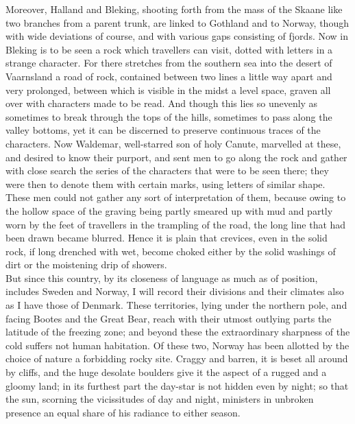 \documentclass[10pt,a4paper]{report}
\begin{document}
Moreover, Halland and Bleking, shooting forth from the mass of the Skaane like two branches from a parent trunk, are linked to Gothland and to Norway, though with wide deviations of course, and with various gaps consisting of fjords. Now in Bleking is to be seen a rock which travellers can visit, dotted with letters in a strange character. For there stretches from the southern sea into the desert of Vaarnsland a road of rock, contained between two lines a little way apart and very prolonged, between which is visible in the midst a level space, graven all over with characters made to be read. And though this lies so unevenly as sometimes to break through the tops of the hills, sometimes to pass along the valley bottoms, yet it can be discerned to preserve continuous traces of the characters. Now Waldemar, well-starred son of holy Canute, marvelled at these, and desired to know their purport, and sent men to go along the rock and gather with close search the series of the characters that were to be seen there; they were then to denote them with certain marks, using letters of similar shape. These men could not gather any sort of interpretation of them, because owing to the hollow space of the graving being partly smeared up with mud and partly worn by the feet of travellers in the trampling of the road, the long line that had been drawn became blurred. Hence it is plain that crevices, even in the solid rock, if long drenched with wet, become choked either by the solid washings of dirt or the moistening drip of showers.\\

But since this country, by its closeness of language as much as of position, includes Sweden and Norway, I will record their divisions and their climates also as I have those of Denmark. These territories, lying under the northern pole, and facing Bootes and the Great Bear, reach with their utmost outlying parts the latitude of the freezing zone; and beyond these the extraordinary sharpness of the cold suffers not human habitation. Of these two, Norway has been allotted by the choice of nature a forbidding rocky site. Craggy and barren, it is beset all around by cliffs, and the huge desolate boulders give it the aspect of a rugged and a gloomy land; in its furthest part the day-star is not hidden even by night; so that the sun, scorning the vicissitudes of day and night, ministers in unbroken presence an equal share of his radiance to either season.\\
\end{document}
